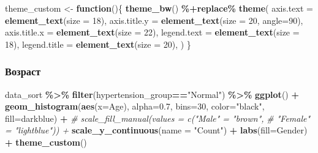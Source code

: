 \documentclass[
]{article}
\newenvironment{Shaded}{\begin{snugshade}}{\end{snugshade}}
\newcommand{\AttributeTok}[1]{\textcolor[rgb]{0.13,0.29,0.53}{#1}}
\newcommand{\CommentTok}[1]{\textcolor[rgb]{0.56,0.35,0.01}{\textit{#1}}}
\newcommand{\ControlFlowTok}[1]{\textcolor[rgb]{0.13,0.29,0.53}{\textbf{#1}}}
\newcommand{\DecValTok}[1]{\textcolor[rgb]{0.00,0.00,0.81}{#1}}
\newcommand{\FloatTok}[1]{\textcolor[rgb]{0.00,0.00,0.81}{#1}}
\newcommand{\FunctionTok}[1]{\textcolor[rgb]{0.13,0.29,0.53}{\textbf{#1}}}
\newcommand{\NormalTok}[1]{#1}
\newcommand{\OtherTok}[1]{\textcolor[rgb]{0.56,0.35,0.01}{#1}}
\newcommand{\SpecialCharTok}[1]{\textcolor[rgb]{0.81,0.36,0.00}{\textbf{#1}}}
\newcommand{\StringTok}[1]{\textcolor[rgb]{0.31,0.60,0.02}{#1}}
\begin{document}
\begin{Shaded}
\begin{Highlighting}[]
\NormalTok{theme\_custom }\OtherTok{\textless{}{-}} \ControlFlowTok{function}\NormalTok{()\{}
  \FunctionTok{theme\_bw}\NormalTok{() }\SpecialCharTok{\%+replace\%}
  \FunctionTok{theme}\NormalTok{(}
    \AttributeTok{axis.text =} \FunctionTok{element\_text}\NormalTok{(}\AttributeTok{size =} \DecValTok{18}\NormalTok{),}
    \AttributeTok{axis.title.y =} \FunctionTok{element\_text}\NormalTok{(}\AttributeTok{size =} \DecValTok{20}\NormalTok{, }\AttributeTok{angle=}\DecValTok{90}\NormalTok{),}
    \AttributeTok{axis.title.x =} \FunctionTok{element\_text}\NormalTok{(}\AttributeTok{size =} \DecValTok{22}\NormalTok{),}
    \AttributeTok{legend.text =} \FunctionTok{element\_text}\NormalTok{(}\AttributeTok{size =} \DecValTok{18}\NormalTok{),}
    \AttributeTok{legend.title =} \FunctionTok{element\_text}\NormalTok{(}\AttributeTok{size =} \DecValTok{20}\NormalTok{),}
\NormalTok{  )}
\NormalTok{\}}
\end{Highlighting}
\end{Shaded}

\subsubsection{Возраст}\label{ux432ux43eux437ux440ux430ux441ux442}

\begin{Shaded}
\begin{Highlighting}[]
\NormalTok{data\_sort }\SpecialCharTok{\%\textgreater{}\%} \FunctionTok{filter}\NormalTok{(hypertension\_group}\SpecialCharTok{==}\StringTok{"Normal"}\NormalTok{) }\SpecialCharTok{\%\textgreater{}\%} \FunctionTok{ggplot}\NormalTok{() }\SpecialCharTok{+}
  \FunctionTok{geom\_histogram}\NormalTok{(}\FunctionTok{aes}\NormalTok{(}\AttributeTok{x=}\NormalTok{Age), }\AttributeTok{alpha=}\FloatTok{0.7}\NormalTok{, }\AttributeTok{bins=}\DecValTok{30}\NormalTok{,}
                 \AttributeTok{color=}\StringTok{"black"}\NormalTok{, }\AttributeTok{fill=}\StringTok{\textquotesingle{}darkblue\textquotesingle{}}\NormalTok{) }\SpecialCharTok{+}
  \CommentTok{\# scale\_fill\_manual(values = c("Male" = "brown", }
  \CommentTok{\#                               "Female" = "lightblue")) +}
  \FunctionTok{scale\_y\_continuous}\NormalTok{(}\AttributeTok{name =} \StringTok{"Count"}\NormalTok{) }\SpecialCharTok{+}
  \FunctionTok{labs}\NormalTok{(}\AttributeTok{fill=}\StringTok{\textquotesingle{}Gender\textquotesingle{}}\NormalTok{) }\SpecialCharTok{+}
  \FunctionTok{theme\_custom}\NormalTok{()}
\end{Highlighting}
\end{Shaded}
\end{document}
